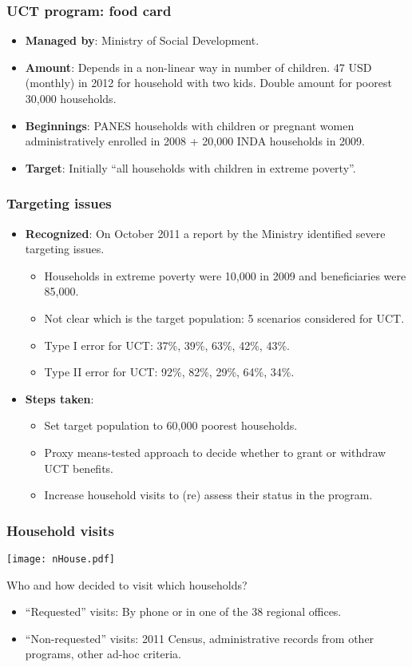 \documentclass{beamer}
\begin{document}
\begin{frame}
\frametitle{UCT program: food card}
\begin{itemize}
\item \textbf{Managed by}: Ministry of Social Development.
\item \textbf{Amount}: Depends in a non-linear way in number of children. 47 USD (monthly) in 2012 for household with two kids. Double amount for poorest 30,000 households.
\item \textbf{Beginnings}: PANES households with children or pregnant women administratively enrolled in 2008 + 20,000 INDA households in 2009.
\item \textbf{Target}: Initially ``all households with children in extreme poverty''.		
\end{itemize}
\end{frame}

\begin{frame}
\frametitle{Targeting issues}
\begin{itemize}
\item \textbf{Recognized}: On October 2011 a report by the Ministry identified severe targeting issues.
\begin{itemize}
\item Households in extreme poverty were 10,000 in 2009 and beneficiaries were 85,000.
\item Not clear which is the target population: 5 scenarios considered for UCT.
\item Type I error for UCT: 37\%, 39\%, 63\%, 42\%, 43\%.
\item Type II error for UCT: 92\%, 82\%, 29\%, 64\%, 34\%.
\end{itemize}
\item \textbf{Steps taken}:
\begin{itemize}
\item Set target population to 60,000 poorest households.
\item Proxy means-tested approach to decide whether to grant or withdraw UCT benefits.
\item Increase household visits to (re) assess their status in the program.
\end{itemize}	
\end{itemize}
\end{frame}

\begin{frame}
\frametitle{Household visits}
\begin{center}
\texttt{[image: nHouse.pdf]}
\label{nHouse}
\end{center}
{\small Who and how decided to visit which households?}
\begin{itemize}
	\item {\small``Requested'' visits: By phone or in one of the 38 regional offices.}
	\item {\small``Non-requested'' visits: 2011 Census, administrative records from other programs, other ad-hoc criteria.}
\end{itemize}
\end{frame}
\end{document}
